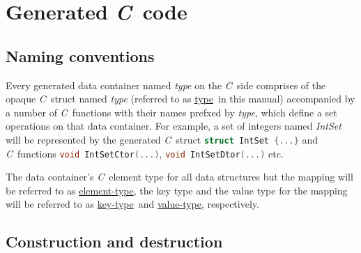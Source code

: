 \documentclass[a4paper]{article}
\newcommand{\C}{\emph{C}}
\newcommand{\st}{\underline{type}}
\newcommand{\et}{\underline{element-type}}
\newcommand{\kt}{\underline{key-type}}
\newcommand{\vt}{\underline{value-type}}
\newcommand{\sv}{\emph{self}}
\newcommand{\meth}[1]{#1}
\begin{document}
\section{Generated \C\ code}


\newcommand{\commonmethods}{


\item \meth{void \st Dtor(\st*\ \sv)}


Destroys the container along with all contained elements.


\item \meth{\st* \st New(size\_t \emph{size})}


Returns a new heap-allocated container constructed with \meth{\st Ctor()}.


\item \meth{void \st Destroy(\st* \sv)}


Frees the heap-allocated container destroying all contained elements.


\item \meth{\st* \st Assign(\st* \sv)}


\emph{Should be called on heap-allocated containers only.}


\item \meth{size\_t \st Size(\st* \sv)}


Returns the number of elements in container.

	
}


\subsection{Naming conventions}


Every generated data container named \emph{type} on the \C\ side comprises of the opaque \C\ struct named \emph{type} (referred to as \st\ in this manual) accompanied by a number of \C\ functions with their names prefxed by \emph{type}, which define a set operations on that data container.
For example, a set of integers named \emph{IntSet} will be represented by the generated \C\ struct \lstinline[language=C]!struct IntSet {...}! and \C\ functions \lstinline[language=C]!void IntSetCtor(...)!, \lstinline[language=C]!void IntSetDtor(...)! etc.

The data container's \C\ element type for all data structures but the mapping will be referred to as \et, the key type and the value type for the mapping will be referred to as \kt\ and \vt, respectively.


\subsection{Construction and destruction}
\end{document}
